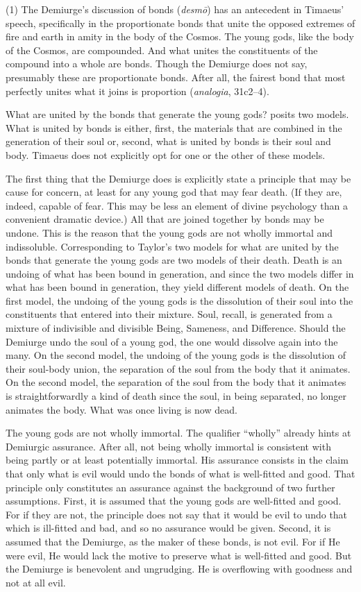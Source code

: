 (1) The Demiurge's discussion of bonds (\emph{desmō}) has an antecedent in Timaeus' speech, specifically in the proportionate bonds that unite the opposed extremes of fire and earth in amity in the body of the Cosmos. The young gods, like the body of the Cosmos, are compounded. And what unites the constituents of the compound into a whole are bonds. Though the Demiurge does not say, presumably these are proportionate bonds. After all, the fairest bond that most perfectly unites what it joins is proportion (\emph{analogia}, 31c2--4). 

What are united by the bonds that generate the young gods? \citet[]{Taylor:1928qb} posits two models. What is united by bonds is either, first, the materials that are combined in the generation of their soul or, second, what is united by bonds is their soul and body. Timaeus does not explicitly opt for one or the other of these models.

The first thing that the Demiurge does is explicitly state a principle that may be cause for concern, at least for any young god that may fear death. (If they are, indeed, capable of fear. This may be less an element of divine psychology than a convenient dramatic device.) All that are joined together by bonds may be undone. This is the reason that the young gods are not wholly immortal and indissoluble. Corresponding to Taylor's two models for what are united by the bonds that generate the young gods are two models of their death. Death is an undoing of what has been bound in generation, and since the two models differ in what has been bound in generation, they yield different models of death. On the first model, the undoing of the young gods is the dissolution of their soul into the constituents that entered into their mixture. Soul, recall, is generated from a mixture of indivisible and divisible Being, Sameness, and Difference. Should the Demiurge undo the soul of a young god, the one would dissolve again into the many. On the second model, the undoing of the young gods is the dissolution of their soul-body union, the separation of the soul from the body that it animates. On the second model, the separation of the soul from the body that it animates is straightforwardly a kind of death since the soul, in being separated, no longer animates the body. What was once living is now dead. 

The young gods are not wholly immortal. The qualifier ``wholly'' already hints at Demiurgic assurance. After all, not being wholly immortal is consistent with being partly or at least potentially immortal. His assurance consists in the claim that only what is evil would undo the bonds of what is well-fitted and good. That principle only constitutes an assurance against the background of two further assumptions. First, it is assumed that the young gods are well-fitted and good. For if they are not, the principle does not say that it would be evil to undo that which is ill-fitted and bad, and so no assurance would be given. Second, it is assumed that the Demiurge, as the maker of these bonds, is not evil. For if He were evil, He would lack the motive to preserve what is well-fitted and good. But the Demiurge is benevolent and ungrudging. He is overflowing with goodness and not at all evil. 

